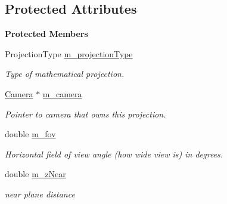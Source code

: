 \subsection*{Protected Attributes}
\begin{Indent}\textbf{ Protected Members}\par
\begin{DoxyCompactItemize}
\item 
\mbox{\label{classrev_1_1_render_projection_a29cc1b4db1510f2ec00b7c2f29f972db}} 
Projection\+Type \mbox{\hyperlink{classrev_1_1_render_projection_a29cc1b4db1510f2ec00b7c2f29f972db}{m\+\_\+projection\+Type}}
\begin{DoxyCompactList}\small\item\em Type of mathematical projection. \end{DoxyCompactList}\item 
\mbox{\label{classrev_1_1_render_projection_acb07bd355dcd3ad9e76e4fac270bacb0}} 
\mbox{\hyperlink{classrev_1_1_camera}{Camera}} $\ast$ \mbox{\hyperlink{classrev_1_1_render_projection_acb07bd355dcd3ad9e76e4fac270bacb0}{m\+\_\+camera}}
\begin{DoxyCompactList}\small\item\em Pointer to camera that owns this projection. \end{DoxyCompactList}\item 
\mbox{\label{classrev_1_1_render_projection_ae57e4ecb3d830f46dc253351f98409b4}} 
double \mbox{\hyperlink{classrev_1_1_render_projection_ae57e4ecb3d830f46dc253351f98409b4}{m\+\_\+fov}}
\begin{DoxyCompactList}\small\item\em Horizontal field of view angle (how wide view is) in degrees. \end{DoxyCompactList}\item 
\mbox{\label{classrev_1_1_render_projection_a9a1559bf143bc522359a61370d425681}} 
double \mbox{\hyperlink{classrev_1_1_render_projection_a9a1559bf143bc522359a61370d425681}{m\+\_\+z\+Near}}
\begin{DoxyCompactList}\small\item\em near plane distance \end{DoxyCompactList}\item 

\end{DoxyCompactItemize}
\end{Indent}
